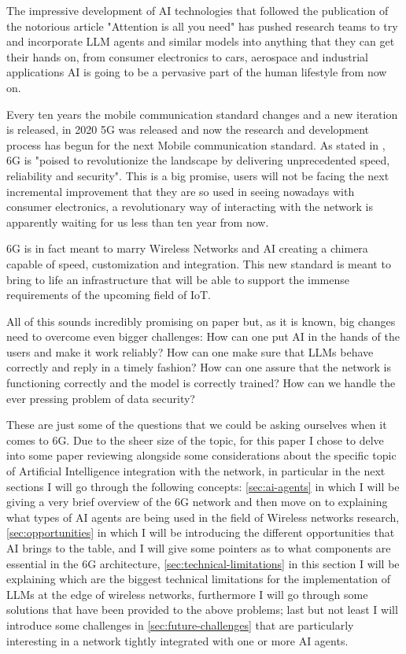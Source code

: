 

The impressive development of AI technologies that followed the publication of the notorious article
"Attention is all you need"\cite{attention} has pushed research teams to try and incorporate LLM
agents and similar models into anything that they can get their hands on, from consumer electronics
to cars, aerospace and industrial applications AI is going to be a pervasive part of the human
lifestyle from now on.

Every ten years the mobile communication standard changes and a new iteration is released, in 2020
5G was released and now the research and development process has begun for the next Mobile communication standard.
As stated in \cite{6ainets}, 6G is "poised to revolutionize the landscape by delivering
unprecedented speed, reliability and security". This is a big promise, users will not be facing the
next incremental improvement that they are so used in seeing nowadays with consumer electronics,
a revolutionary way of interacting with the network is apparently waiting for us less than ten year
from now.

6G is in fact meant to marry Wireless Networks and AI creating a chimera capable of speed,
customization and integration. This new standard is meant to bring to life an infrastructure that
will be able to support the immense requirements of the upcoming field of IoT.

All of this sounds incredibly promising on paper but, as it is known, big changes need to overcome even
bigger challenges: How can one put AI in the hands of the users and make it work reliably? How can
one make sure that LLMs behave correctly and reply in a timely fashion? How can one
assure that the network is functioning correctly and the model is correctly trained? How can we
handle the ever pressing problem of data security?

These are just some of the questions that we could be asking ourselves when it comes to 6G. Due to the sheer size of the topic, for this
paper I chose to delve into some paper reviewing alongside some considerations about the specific
topic of Artificial Intelligence integration with the network, in particular in the next sections I
will go through the following concepts: \ref{sec:ai-agents} in which I will be giving a very brief
overview of the 6G network and then move on to explaining what types
of AI agents are being used in the field of Wireless networks research, \ref{sec:opportunities} in
which I will be introducing the different opportunities that AI brings to the table, and I will
give some pointers as to what components are essential in the 6G architecture, \ref{sec:technical-limitations} in this section I will be explaining which are the biggest technical limitations for the implementation of LLMs at the edge of wireless networks, furthermore I will go through some solutions that have been provided to the above
problems; last but not least I will
introduce some challenges in \ref{sec:future-challenges} that are particularly interesting in a
network tightly integrated with one or more AI agents.
